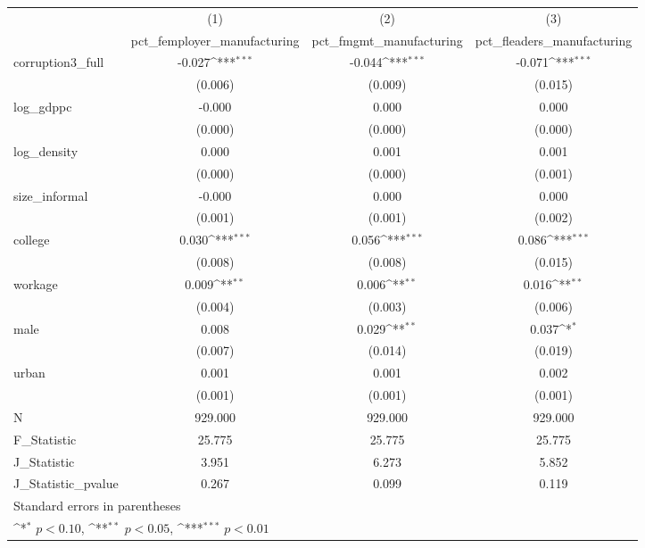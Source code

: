 {
\def\sym#1{\ifmmode^{#1}\else\(^{#1}\)\fi}
\begin{tabular}{l*{3}{c}}
\hline\hline
            &\multicolumn{1}{c}{(1)}&\multicolumn{1}{c}{(2)}&\multicolumn{1}{c}{(3)}\\
            &\multicolumn{1}{c}{pct\_femployer\_manufacturing}&\multicolumn{1}{c}{pct\_fmgmt\_manufacturing}&\multicolumn{1}{c}{pct\_fleaders\_manufacturing}\\
\hline
corruption3\_full&      -0.027\sym{***}&      -0.044\sym{***}&      -0.071\sym{***}\\
            &     (0.006)         &     (0.009)         &     (0.015)         \\
[1em]
log\_gdppc   &      -0.000         &       0.000         &       0.000         \\
            &     (0.000)         &     (0.000)         &     (0.000)         \\
[1em]
log\_density &       0.000         &       0.001         &       0.001         \\
            &     (0.000)         &     (0.000)         &     (0.001)         \\
[1em]
size\_informal&      -0.000         &       0.000         &       0.000         \\
            &     (0.001)         &     (0.001)         &     (0.002)         \\
[1em]
college     &       0.030\sym{***}&       0.056\sym{***}&       0.086\sym{***}\\
            &     (0.008)         &     (0.008)         &     (0.015)         \\
[1em]
workage     &       0.009\sym{**} &       0.006\sym{**} &       0.016\sym{**} \\
            &     (0.004)         &     (0.003)         &     (0.006)         \\
[1em]
male        &       0.008         &       0.029\sym{**} &       0.037\sym{*}  \\
            &     (0.007)         &     (0.014)         &     (0.019)         \\
[1em]
urban       &       0.001         &       0.001         &       0.002         \\
            &     (0.001)         &     (0.001)         &     (0.001)         \\
\hline
N           &     929.000         &     929.000         &     929.000         \\
F\_Statistic &      25.775         &      25.775         &      25.775         \\
J\_Statistic &       3.951         &       6.273         &       5.852         \\
J\_Statistic\_pvalue&       0.267         &       0.099         &       0.119         \\
\hline\hline
\multicolumn{4}{l}{\footnotesize Standard errors in parentheses}\\
\multicolumn{4}{l}{\footnotesize \sym{*} \(p<0.10\), \sym{**} \(p<0.05\), \sym{***} \(p<0.01\)}\\
\end{tabular}
}
